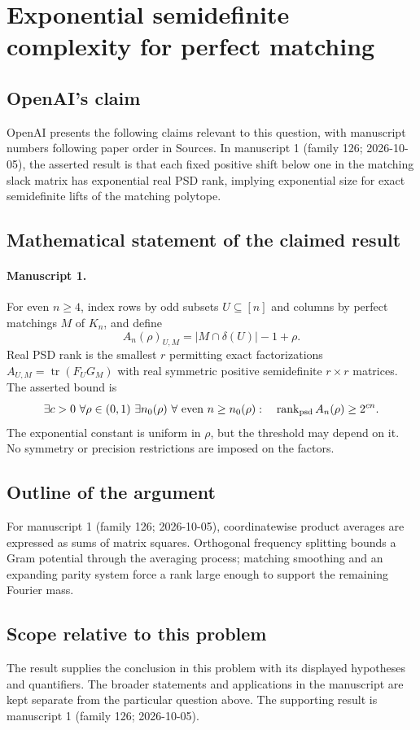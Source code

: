 \documentclass[11pt]{article}
\begin{document}
\section*{Exponential semidefinite complexity for perfect matching}

\subsection{OpenAI's claim}
OpenAI presents the following claims relevant to this question, with manuscript numbers following paper order in Sources. In manuscript 1 (family 126; 2026-10-05), the asserted result is that each fixed positive shift below one in the matching slack matrix has exponential real PSD rank, implying exponential size for exact semidefinite lifts of the matching polytope.

\subsection{Mathematical statement of the claimed result}
\paragraph{Manuscript 1.}
For even $n\ge4$, index rows by odd subsets $U\subseteq[n]$ and columns by perfect matchings $M$ of $K_n$, and define
\[
 A_n(\rho)_{U,M}=|M\cap\delta(U)|-1+\rho.
\]
Real PSD rank is the smallest $r$ permitting exact factorizations $A_{U,M}=\operatorname{tr}(F_UG_M)$ with real symmetric positive semidefinite $r\times r$ matrices. The asserted bound is
\[
 \exists c>0\ \forall\rho\in(0,1)\ \exists n_0(\rho)\ \forall\text{ even }n\ge n_0(\rho):\quad
 \operatorname{rank}_{\rm psd}A_n(\rho)\ge2^{cn}.
\]
The exponential constant is uniform in $\rho$, but the threshold may depend on it. No symmetry or precision restrictions are imposed on the factors.

\subsection{Outline of the argument}
For manuscript 1 (family 126; 2026-10-05), coordinatewise product averages are expressed as sums of matrix squares. Orthogonal frequency splitting bounds a Gram potential through the averaging process; matching smoothing and an expanding parity system force a rank large enough to support the remaining Fourier mass.

\subsection{Scope relative to this problem}
The result supplies the conclusion in this problem with its displayed hypotheses and quantifiers. The broader statements and applications in the manuscript are kept separate from the particular question above. The supporting result is manuscript 1 (family 126; 2026-10-05).
\end{document}
